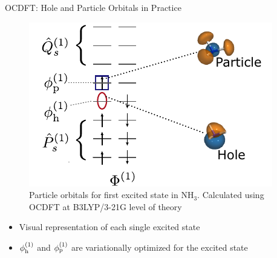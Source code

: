 \documentclass[t]{beamer}
\begin{document}
\begin{frame}{OCDFT: Hole and Particle Orbitals in Practice}
\begin{figure}
\centering
\includegraphics{hole_particle_practice.pdf}
\caption*{Particle orbitals for first excited state in NH$_3$. Calculated using OCDFT at B3LYP/3-21G level of theory} 
\end{figure}
\begin{itemize}
\item Visual representation of each single excited state
\item $\phi_{\rm h}^{(1)}$ and $\phi_{\rm p}^{(1)}$ are variationally optimized for the excited state
\end{itemize}
\end{frame}
\end{document}
